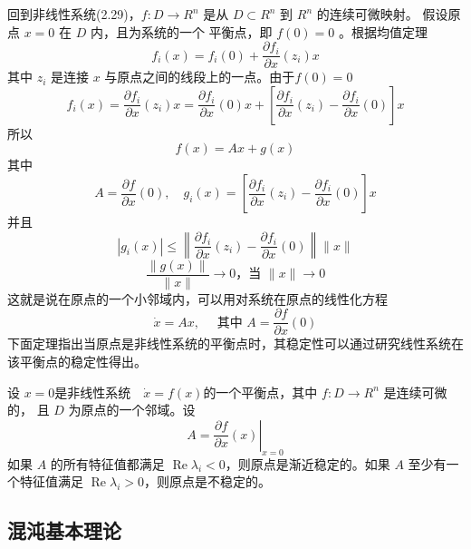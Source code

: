 回到非线性系统(2.29)，$f: D \rightarrow R^n$ 是从 $D \subset R^n$ 到 $R^n$ 的连续可微映射。
假设原点 $x=0$ 在 $D$ 内，且为系统的一个 平衡点，即 $f(0)=0$ 。根据均值定理
\begin{equation}
    f_i(x)=f_i(0)+\frac{\partial f_i}{\partial x}\left(z_i\right) x
\end{equation}
其中 $z_i$ 是连接 $x$ 与原点之间的线段上的一点。由于$f(0)=0$
\begin{equation}
    f_i(x)=\frac{\partial f_i}{\partial x}\left(z_i\right) x=\frac{\partial f_i}{\partial x}(0) x+\left[\frac{\partial f_i}{\partial x}\left(z_i\right)-\frac{\partial f_i}{\partial x}(0)\right] x
\end{equation}
所以
\begin{equation}
    f(x)=A x+g(x)
\end{equation}
其中
\begin{equation}
    A=\frac{\partial f}{\partial x}(0),\quad g_i(x)=\left[\frac{\partial f_i}{\partial x}\left(z_i\right)-\frac{\partial f_i}{\partial x}(0)\right] x
\end{equation}
并且
\begin{equation}
    \left|g_i(x)\right| \leqslant\left\|\frac{\partial f_i}{\partial x}\left(z_i\right)-\frac{\partial f_i}{\partial x}(0)\right\|\|x\|
\end{equation}
\begin{equation}
    \frac{\|g(x)\|}{\|x\|} \rightarrow 0 \text {，当 }\|x\| \rightarrow 0
\end{equation}
这就是说在原点的一个小邻域内，可以用对系统在原点的线性化方程
\begin{equation}
    \dot{x}=A x,\quad \text { 其中 } A=\frac{\partial f}{\partial x}(0)
\end{equation}
下面定理指出当原点是非线性系统的平衡点时，其稳定性可以通过研究线性系统在该平衡点的稳定性得出。
\begin{theorem}
    设 $x=0$是非线性系统$\quad \dot{x}=f(x)$的一个平衡点，其中 $f: D \rightarrow R^n$ 是连续可微的，
    且 $D$ 为原点的一个邻域。设
    \begin{equation}
        A=\left.\frac{\partial f}{\partial x}(x)\right|_{x=0}
    \end{equation}
    如果 $A$ 的所有特征值都满足 $\operatorname{Re} \lambda_i<0$，则原点是渐近稳定的。如果 $A$ 至少有一个特征值满足 $\operatorname{Re} \lambda_i>0$，则原点是不稳定的。
\end{theorem}
\subsection{混沌基本理论}

